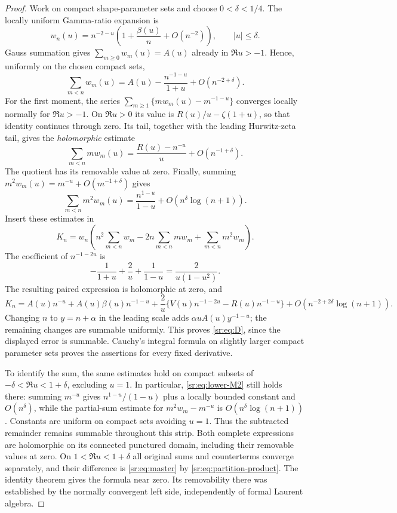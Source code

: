\documentclass[11pt,letterpaper]{article}
\theoremstyle{definition}
\theoremstyle{remark}
\numberwithin{equation}{section}
\begin{document}
\begin{proof}
Work on compact shape-parameter sets and choose $0<\delta<1/4$.
The locally uniform Gamma-ratio expansion \cite[5.11.13]{dlmfgammaratio}
is
\begin{equation}\label{sr:eq:w-asymptotic}
 w_n(u)=n^{-2-u}\left(1+\frac{\beta(u)}n+O(n^{-2})\right),
 \qquad |u|\le\delta.
\end{equation}
Gauss summation gives $\sum_{m\ge0}w_m(u)=A(u)$ already in
$\Re u>-1$. Hence, uniformly on the chosen compact sets,
\begin{equation}\label{sr:eq:lower-M0}
 \sum_{m<n}w_m(u)=A(u)-\frac{n^{-1-u}}{1+u}+O(n^{-2+\delta}).
\end{equation}
For the first moment, the series
$\sum_{m\ge1}\{mw_m(u)-m^{-1-u}\}$ converges locally normally for
$\Re u>-1$. On $\Re u>0$ its value is $R(u)/u-\zeta(1+u)$, so that
identity continues through zero. Its tail, together with the leading
Hurwitz-zeta tail, gives the \emph{holomorphic} estimate
\begin{equation}\label{sr:eq:lower-M1}
 \sum_{m<n}mw_m(u)=\frac{R(u)-n^{-u}}u+O(n^{-1+\delta}).
\end{equation}
The quotient has its removable value at zero. Finally, summing
$m^2w_m(u)=m^{-u}+O(m^{-1+\delta})$ gives
\begin{equation}\label{sr:eq:lower-M2}
 \sum_{m<n}m^2w_m(u)=\frac{n^{1-u}}{1-u}
 +O(n^\delta\log(n+1)).
\end{equation}
Insert these estimates in
\[
 K_n=w_n\left(n^2\sum_{m<n}w_m-2n\sum_{m<n}mw_m
                         +\sum_{m<n}m^2w_m\right).
\]
The coefficient of $n^{-1-2u}$ is
\[
 -\frac1{1+u}+\frac2u+\frac1{1-u}
 =\frac{2}{u(1-u^2)}.
\]
The resulting paired expression is holomorphic at zero, and
\[
 K_n=A(u)n^{-u}+A(u)\beta(u)n^{-1-u}
 +\frac2u\{V(u)n^{-1-2u}-R(u)n^{-1-u}\}
 +O(n^{-2+2\delta}\log(n+1)).
\]
Changing $n$ to $y=n+\alpha$ in the leading scale adds
$\alpha uA(u)y^{-1-u}$; the remaining changes are summable uniformly.
This proves \eqref{sr:eq:D}, since the displayed error is summable.
Cauchy's integral formula on slightly larger compact parameter sets
proves the assertions for every fixed derivative.

To identify the sum, the same estimates hold on compact subsets of
$-\delta<\Re u<1+\delta$, excluding $u=1$. In particular,
\eqref{sr:eq:lower-M2} still holds there: summing $m^{-u}$ gives
$n^{1-u}/(1-u)$ plus a locally bounded constant and
$O(n^\delta)$, while the partial-sum estimate for
$m^2w_m-m^{-u}$ is $O(n^\delta\log(n+1))$. Constants are uniform
on compact sets avoiding $u=1$. Thus the subtracted remainder remains
summable throughout this strip. Both complete expressions are
holomorphic on its connected punctured domain, including their
removable values at zero.
On $1<\Re u<1+\delta$ all original sums and counterterms converge
separately, and their difference is \eqref{sr:eq:master} by
\eqref{sr:eq:partition-product}. The identity theorem gives the
formula near zero. Its removability there was established by the
normally convergent left side, independently of formal Laurent algebra.
\end{proof}
\end{document}
